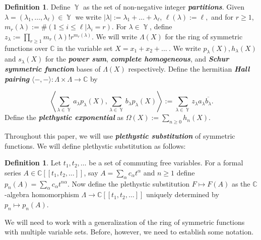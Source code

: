 \documentclass[12pt,reqno]{amsart}
\theoremstyle{definition}
\newtheorem{defn}[thm]{Definition}
\DeclareMathOperator{\Par}{\mathbb{Y}}
\begin{document}
\begin{defn}
    Define $\Par$ as the set of non-negative integer\textit{\textbf{ partitions}}. Given $\lambda = (\lambda_1,\ldots,\lambda_{\ell}) \in \Par$ we write $|\lambda|:= \lambda_1+\ldots + \lambda_{\ell}$, $\ell(\lambda):= \ell,$ and for $r \geq 1$, $m_{r}(\lambda):= \#( 1\leq i \leq \ell | \lambda_i = r).$ For $\lambda \in \Par$, define $z_{\lambda}:= \prod_{r\geq 1} m_r(\lambda)! r^{m_r(\lambda)}.$ We will write $\Lambda(X)$ for the ring of symmetric functions over $\mathbb{C}$ in the variable set $X = x_1+x_2+\ldots ~.$ We write $p_{\lambda}(X),h_{\lambda}(X)$ and $s_{\lambda}(X)$ for the \textit{\textbf{power sum}}, \textit{\textbf{complete homogeneous}}, and \textit{\textbf{Schur symmetric function}} bases of $\Lambda(X)$ respectively. Define the hermitian \textit{\textbf{Hall pairing}} $\langle -,- \rangle: \Lambda \times \Lambda \rightarrow \mathbb{C}$ by

    $$ \left\langle \sum_{\lambda \in \Par} a_{\lambda} p_{\lambda}(X) , \sum_{\lambda \in \Par} b_{\lambda} p_{\lambda}(X) \right \rangle := \sum_{\lambda \in \Par} z_{\lambda} a_{\lambda}\overline{b_{\lambda}}.$$ Define the \textit{\textbf{plethystic exponential}} as $\Omega(X):= \sum_{n \geq 0} h_n(X).$ 
\end{defn}

Throughout this paper, we will use \textit{\textbf{plethystic substitution}} of symmetric functions. We will define plethystic substitution as follows:

\begin{defn}
    Let $t_1,t_2,\ldots$ be a set of commuting free variables. For a formal series $A \in \mathbb{C}[[t_1,t_2,\ldots ]]$, say $A= \sum_{\alpha} c_{\alpha} t^{\alpha}$ and $n \geq 1$ define 
    $p_n(A) = \sum_{\alpha} c_{\alpha} t^{n\alpha}.$ Now define the plethystic substitution $F \mapsto F(A)$ as the $\mathbb{C}$-algebra homomorphism $\Lambda \rightarrow \mathbb{C}[[t_1,t_2,\ldots ]]$ uniquely determined by $p_n \mapsto p_n(A).$
\end{defn}

We will need to work with a generalization of the ring of symmetric functions with multiple variable sets. Before, however, we need to establish some notation.
\end{document}
